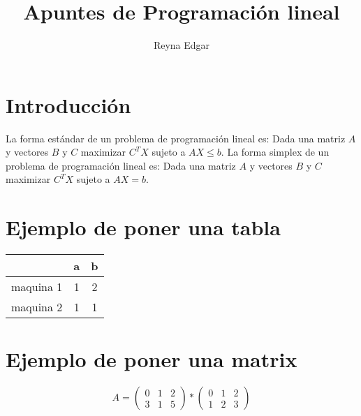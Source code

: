 \documentclass{article}
\title{Apuntes de Programación lineal}
\author{Reyna Edgar}
\begin{document}
\maketitle
\tableofcontents
\section{Introducción}
\label{sec:introduccion}
La forma estándar de un problema de programación lineal es:
Dada una matriz $A$ y vectores $B$ y $C$ maximizar $C^TX$ sujeto a
$AX\leq b$.\newline
La forma simplex de un problema de programación lineal es:
Dada una matriz $A$ y vectores $B$ y $C$ maximizar $C^TX$ sujeto a
$AX= b$.

\section{Ejemplo de poner una tabla}
\label{sec:ejemplo-de-poner}
\begin{tabular}{|c|c|c|}
  \hline
           &a&b\\
  \hline
  maquina 1&1&2\\
  maquina 2&1&1\\
  \hline
\end{tabular}

\section{Ejemplo de poner una matrix}
\label{sec:poner-tablas}

\begin{equation}
  \label{eq:1}
  A=
  \begin{pmatrix}
    0&1&2\\
    3&1&5
  \end{pmatrix}
  *
  \begin{pmatrix}
    0&1&2\\
    1&2&3
  \end{pmatrix}
\end{equation}
\end{document}
